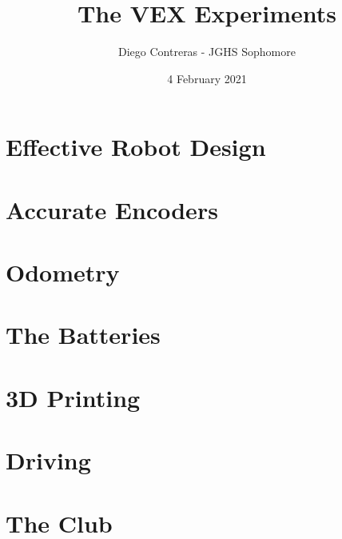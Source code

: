 \documentclass[12pt]{article}
\title{The VEX Experiments}
\author{Diego Contreras - JGHS Sophomore}
\date{4 February 2021}
\begin{document}
\maketitle
\newpage
\tableofcontents




\newpage
\section{Effective Robot Design}

\newpage
\section{Accurate Encoders}
\label{section:accu_encoders}

\newpage
\section{Odometry} %

\newpage
\section{The Batteries}

\newpage
\section{3D Printing}

\newpage
\section{Driving}

\newpage
\section{The Club}


\end{document}
